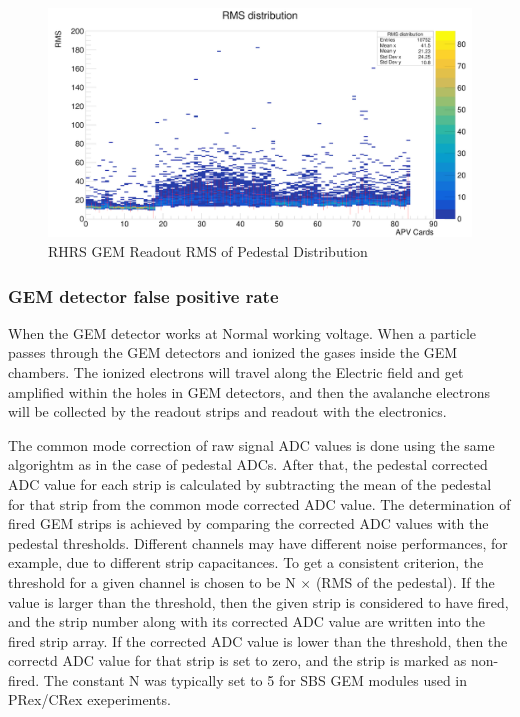 \begin{figure}[!htbp]
    \centering
    \includegraphics[width=\textwidth]{images/chap5/rhrs_pedestal.png}
    \caption{RHRS GEM Readout RMS of Pedestal Distribution}
    \label{fig:rhrs_pedestal_distribution}
\end{figure}


\subsubsection{GEM detector false positive rate}

When the GEM detector works at Normal working voltage. When a particle passes through  
the GEM detectors and ionized the gases inside the GEM chambers. The ionized electrons 
will travel along the Electric field and get amplified within the holes in GEM detectors, 
and then the avalanche electrons will be collected by the readout strips and readout with the electronics. 

The common mode correction of raw signal ADC values is done using the same algorightm as
 in the case of pedestal ADCs. After that, the pedestal corrected ADC value for each strip is
calculated by  subtracting  the mean of the pedestal for that strip from the common mode 
corrected ADC value. The determination of fired  GEM  strips is achieved  
by comparing the corrected ADC  values with the pedestal thresholds. Different channels may have different 
noise performances, for example,  due to different strip capacitances.  To get a consistent criterion,
 the threshold for a  given channel is chosen to be N $\times$ (RMS of the pedestal).  
If the value is larger than the threshold, then the  given strip is  considered to have fired,
 and the strip number along with  its corrected ADC value are written into the fired strip array.  
If the corrected ADC value is lower than the threshold, then the correctd ADC value for that strip 
is set to zero, and the strip is marked as non-fired. The constant N was typically set to 5 for 
SBS GEM modules used in PRex/CRex exeperiments. 

